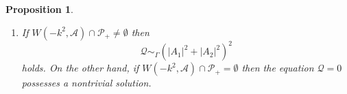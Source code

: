 \documentclass[11pt,a4paper,oneside]{amsart}
\theoremstyle{plain}
\newtheorem{proposition}[theorem]{Proposition}
\theoremstyle{remark}
\newtheorem{remark}[theorem]{Remark}
\numberwithin{equation}{section}
\newcommand{\R}{\mathbb{R}}
\renewcommand{\Re}{\operatorname{Re}}
\theoremstyle{definition}
\begin{document}
\begin{proposition}
\begin{enumerate}
\[
	\mathcal{Q}(A_1,A_2) =c( (\begin{bmatrix}|B_1|^2 &2\Re (\overline{B_1}B_2) & |B_2|^2\end{bmatrix}\Gamma')^2+(\begin{bmatrix}|B_1|^2 &2\Re (\overline{B_1}B_2) & |B_2|^2\end{bmatrix} \widetilde{\Gamma}')^2),
\]
where $\widetilde{\Gamma}':=
\frac1{k'}\mathscr{A}'\Gamma'=\tfrac{|\det \mathscr{M}|}{k}\mathscr{A}' \Gamma'$.
\item
If $W(-k^2,\mathscr{A}) \cap \mathcal{P}_+\neq\emptyset$ then
\[
	\mathcal{Q} \sim_\Gamma (|A_1|^2 + |A_2|^2)^2
\]
holds.
On the other hand,
if $W(-k^2,\mathscr{A}) \cap \mathcal{P}_+=\emptyset$ then the equation $\mathcal{Q}=0$ possesses a nontrivial solution.
\end{enumerate}
\end{proposition}
\end{document}
